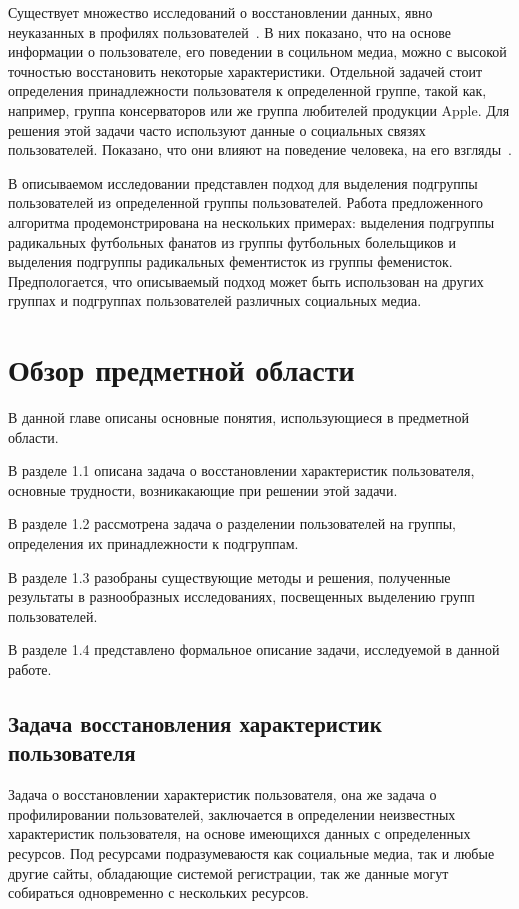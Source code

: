 \documentclass[annotation,times,page4]{itmo-student-thesis}
\begin{document}
Существует множество исследований о восстановлении данных, явно неуказанных в профилях пользователей~\cite{blachnio2015facebook, schwartz2013personality, turdakov2013opredelenie, peersman2011predicting}. В них показано, что на основе информации о пользователе, его поведении в социльном медиа, можно с высокой точностью восстановить некоторые характеристики. 
Отдельной задачей стоит определения принадлежности пользователя к определенной группе, такой как, например, группа консерваторов или же группа любителей продукции Apple. Для решения  этой задачи часто используют данные о социальных связях пользователей. Показано, что они влияют на поведение человека, на его взгляды~\cite{trusov2010determining, bond201261}. 

В описываемом исследовании представлен подход для выделения подгруппы пользователей из определенной группы пользователей. Работа предложенного алгоритма продемонстрирована на нескольких примерах: выделения подгруппы радикальных футбольных фанатов из группы футбольных болельщиков и выделения подгруппы радикальных фементисток из группы феменисток. Предпологается, что описываемый подход может быть использован на других группах и подгруппах пользователей различных социальных медиа.

\chapter{Обзор предметной области}
В данной главе описаны основные понятия, использующиеся в предметной области.

В разделе 1.1 описана задача о восстановлении характеристик пользователя, основные трудности, возникакающие при решении этой задачи. 

В разделе 1.2 рассмотрена задача о разделении пользователей на группы, определения их принадлежности к подгруппам.

В разделе 1.3 разобраны существующие методы и решения, полученные результаты в разнообразных исследованиях, посвещенных выделению групп пользователей.

В разделе 1.4 представлено формальное описание задачи, исследуемой в данной работе.

\section{Задача восстановления характеристик пользователя}
Задача о восстановлении характеристик пользователя, она же задача о профилировании пользователей, заключается в определении неизвестных характеристик пользователя, на основе имеющихся данных с определенных ресурсов. Под ресурсами подразумеваюстя как социальные медиа, так и любые другие сайты, обладающие системой регистрации, так же данные могут собираться одновременно с нескольких ресурсов.
\end{document}
